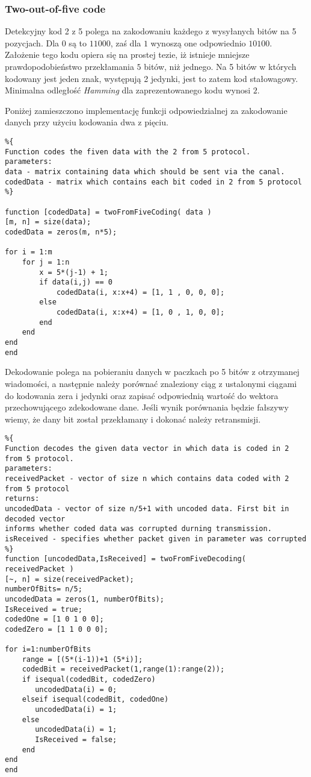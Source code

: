 \documentclass{article}
\begin{document}
\subsubsection{Two-out-of-five code}

Detekcyjny kod 2 z 5 polega na zakodowaniu każdego z wysyłanych bitów na 5 pozycjach. Dla $0$ są to $11000$, zaś dla $1$ wynoszą one odpowiednio $10100$. Założenie tego kodu opiera się na prostej tezie, iż istnieje mniejsze prawdopodobieństwo przekłamania $5$ bitów, niż jednego. Na 5 bitów w których kodowany jest jeden znak, występują 2 jedynki, jest to zatem kod stałowagowy. Minimalna odległość \textit{Hamming} dla zaprezentowanego kodu wynosi $2$.



\vspace{2mm}
\noindent
Poniżej zamieszczono implementację funkcji odpowiedzialnej za zakodowanie danych przy użyciu kodowania dwa z pięciu.

\begin{verbatim}
%{
Function codes the fiven data with the 2 from 5 protocol.
parameters:
data - matrix containing data which should be sent via the canal.
codedData - matrix which contains each bit coded in 2 from 5 protocol
%}

function [codedData] = twoFromFiveCoding( data )
[m, n] = size(data);
codedData = zeros(m, n*5);

for i = 1:m
    for j = 1:n
        x = 5*(j-1) + 1;
        if data(i,j) == 0
            codedData(i, x:x+4) = [1, 1 , 0, 0, 0];
        else
            codedData(i, x:x+4) = [1, 0 , 1, 0, 0];
        end
    end
end 
end
\end{verbatim}

\newpage

Dekodowanie polega na pobieraniu danych w paczkach po 5 bitów z otrzymanej wiadomości, a następnie należy porównać znaleziony ciąg z ustalonymi ciągami do kodowania zera i jedynki oraz  zapisać odpowiednią wartość do wektora przechowującego zdekodowane dane. Jeśli wynik porównania będzie fałszywy wiemy, że dany bit został przekłamany i dokonać należy retransmisji.

\begin{verbatim}
%{
Function decodes the given data vector in which data is coded in 2 from 5 protocol.
parameters:
receivedPacket - vector of size n which contains data coded with 2 from 5 protocol
returns:
uncodedData - vector of size n/5+1 with uncoded data. First bit in decoded vector
informs whether coded data was corrupted durning transmission.
isReceived - specifies whether packet given in parameter was corrupted
%}
function [uncodedData,IsReceived] = twoFromFiveDecoding( receivedPacket )
[~, n] = size(receivedPacket);
numberOfBits= n/5;
uncodedData = zeros(1, numberOfBits);
IsReceived = true;
codedOne = [1 0 1 0 0];
codedZero = [1 1 0 0 0];

for i=1:numberOfBits
    range = [(5*(i-1))+1 (5*i)];
    codedBit = receivedPacket(1,range(1):range(2));
    if isequal(codedBit, codedZero)
       uncodedData(i) = 0; 
    elseif isequal(codedBit, codedOne)
       uncodedData(i) = 1;
    else
       uncodedData(i) = 1;
       IsReceived = false;
    end
end    
end
\end{verbatim} 
\end{document}
